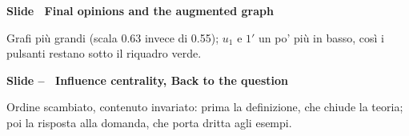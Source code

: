 \par\addvspace{14pt}\noindent\begin{minipage}{\textwidth}
{\color{unipd}\bfseries Slide  \textperiodcentered\ Final opinions and the augmented graph}\par\smallskip
{\small Grafi più grandi (scala 0.63 invece di 0.55); $u_1$ e $1'$ un po' più in basso, così i pulsanti restano sotto il riquadro verde.}\par\smallskip
\noindent\begin{minipage}[t]{0.36\textwidth}\par
{}\par\smallskip
\end{minipage}\hfill\begin{minipage}[t]{0.61\textwidth}\par
{}\par\smallskip
\end{minipage}\par
\end{minipage}\par
\par\addvspace{14pt}\noindent\begin{minipage}{\textwidth}
{\color{unipd}\bfseries Slide -- \textperiodcentered\ Influence centrality, Back to the question}\spostata\par\smallskip
{\small Ordine scambiato, contenuto invariato: prima la definizione, che chiude la teoria; poi la risposta alla domanda, che porta dritta agli esempi.}\par\smallskip
\noindent\begin{minipage}[t]{0.36\textwidth}\par
{}\par\smallskip
{}\par\smallskip
\end{minipage}\hfill\begin{minipage}[t]{0.61\textwidth}\par
{}\par\smallskip
{}\par\smallskip
\end{minipage}\par
\end{minipage}\par
